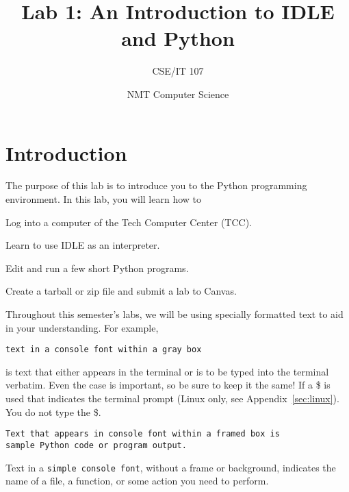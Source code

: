 \documentclass[12pt,hidelinks]{article}
\title{Lab 1: An Introduction to IDLE and Python}
\author{CSE/IT 107}
\date{NMT Computer Science}
\begin{document}
\maketitle

\section{Introduction}

The purpose of this lab is to introduce you to the Python programming
environment. In this lab, you will learn how to 
\begin{enumerate*}
\item Log into a computer of the Tech Computer Center (TCC).
\item Learn to use IDLE as an interpreter.
\item Edit and run a few short Python programs.
\item Create a tarball or zip file and submit a lab to Canvas.
\end{enumerate*}


Throughout this semester's labs, we will be using specially formatted text to
aid in your understanding. For example, 
\begin{lstlisting}[style=bash]
text in a console font within a gray box
\end{lstlisting}
is text that either appears in the terminal or is to be typed into the terminal
verbatim. Even the case is important, so be sure to keep it the same! If a \$ is
used that indicates the terminal prompt (Linux only, see
Appendix~\ref{sec:linux}). You do not type the \$.

\vspace{12pt}

\begin{lstlisting}[style=python]
Text that appears in console font within a framed box is 
sample Python code or program output.
\end{lstlisting}

\vspace{12pt}

Text in a \texttt{simple console font}, without a frame or background, indicates
the name of a file, a function, or some action you need to perform.

\end{document}
